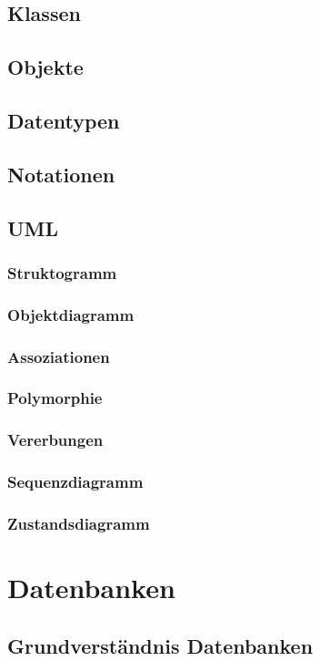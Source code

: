 \documentclass[12pt,a4paper]{article}
\begin{document}
\subsection{Klassen}
\subsection{Objekte}
\subsection{Datentypen}
\subsection{Notationen}
\subsection{UML}
\subsubsection{Struktogramm}
\subsubsection{Objektdiagramm}
\subsubsection{Assoziationen}
\subsubsection{Polymorphie}
\subsubsection{Vererbungen}
\subsubsection{Sequenzdiagramm}
\subsubsection{Zustandsdiagramm}
\section{Datenbanken}
\subsection{Grundverständnis Datenbanken}
\end{document}
